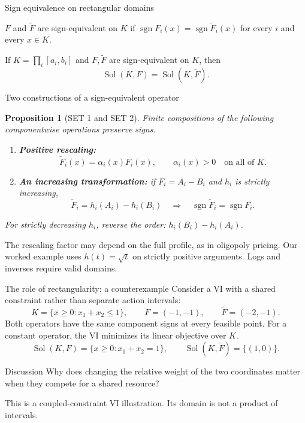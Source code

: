 \documentclass[11pt,aspectratio=169]{beamer}
\theoremstyle{plain}
\newtheorem{proposition}{Proposition}
\theoremstyle{definition}
\DeclareMathOperator{\sgn}{sgn}
\DeclareMathOperator{\Sol}{Sol}
\newcommand{\compactmath}{%
 \setlength{\abovedisplayskip}{4pt}\setlength{\belowdisplayskip}{4pt}%
 \setlength{\abovedisplayshortskip}{2pt}\setlength{\belowdisplayshortskip}{4pt}}
\begin{document}
\begin{frame}{Sign equivalence on rectangular domains}
\small\compactmath
\setcounter{theorem}{1}
\begin{definition}
$F$ and $\widetilde F$ are sign-equivalent on $K$ if
$\sgn F_i(x)=\sgn\widetilde F_i(x)$ for every $i$ and every $x\in K$.
\end{definition}
\setcounter{theorem}{0}
\begin{theorem}
If $K=\prod_i[a_i,b_i]$ and $F,\widetilde F$ are sign-equivalent on $K$, then
\[
 \Sol(K,F)=\Sol(K,\widetilde F).
\]
\end{theorem}

\end{frame}


\begin{frame}{Two constructions of a sign-equivalent operator}
\compactmath
\setcounter{proposition}{0}
\begin{proposition}[SET 1 and SET 2]
Finite compositions of the following componentwise operations preserve signs.
\begin{enumerate}
\item \textbf{Positive rescaling:}
\[
 \widetilde F_i(x)=\alpha_i(x)F_i(x),\qquad \alpha_i(x)>0\quad\text{on all of }K.
\]
\item \textbf{An increasing transformation:} if $F_i=A_i-B_i$ and $h_i$ is strictly increasing,
\[
 \widetilde F_i=h_i(A_i)-h_i(B_i)
 \quad\Longrightarrow\quad \sgn\widetilde F_i=\sgn F_i.
\]
\end{enumerate}
For strictly decreasing $h_i$, reverse the order: $h_i(B_i)-h_i(A_i)$.
\end{proposition}
The rescaling factor may depend on the full profile, as in oligopoly pricing.
Our worked example uses $h(t)=\sqrt t$ on strictly positive arguments.
Logs and inverses require valid domains.
\end{frame}


\begin{frame}{The role of rectangularity: a counterexample}
\compactmath
Consider a VI with a shared constraint rather than separate action intervals:
\[
 K=\{x\geq0:x_1+x_2\leq1\},\qquad
 F=(-1,-1),\qquad \widetilde F=(-2,-1).
\]
Both operators have the same component signs at every feasible point.
For a constant operator, the VI minimizes its linear objective over $K$.
\[
 \Sol(K,F)=\{x\geq0:x_1+x_2=1\},\qquad
 \Sol(K,\widetilde F)=\{(1,0)\}.
\]
\begin{block}{Discussion}
Why does changing the relative weight of the two coordinates matter when they
compete for a shared resource?
\end{block}
This is a coupled-constraint VI illustration. Its domain is not a product of intervals.
\end{frame}
\end{document}

